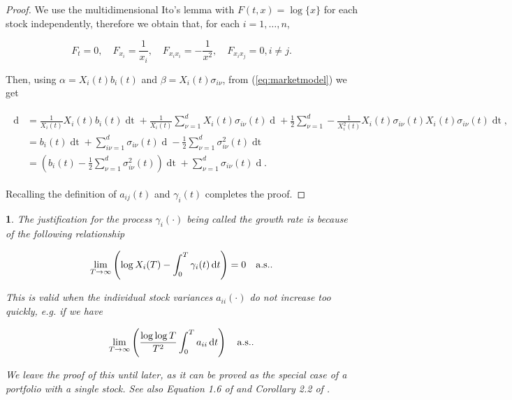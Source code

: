\documentclass[british]{amsart} \usepackage{lmodern}
\numberwithin{equation}{section} \numberwithin{figure}{section}
\theoremstyle{plain} \newtheorem{thm}{\protect\theoremname}[section]
\theoremstyle{definition} \newtheorem{defn}[thm]{\protect\definitionname}
\theoremstyle{plain} \newtheorem{assumption}[thm]{\protect\assumptionname}
\theoremstyle{plain} \newtheorem{lem}[thm]{\protect\lemmaname}
\theoremstyle{plain} \newtheorem{prop}[thm]{\protect\propositionname}
\theoremstyle{remark} \newtheorem{rem}[thm]{\protect\remarkname}
\theoremstyle{plain} \newtheorem{cor}[thm]{\protect\corollaryname}
\renewcommand{\d}[1]{\mathop{\mathrm{d}{#1}}}
\newcommand{\rangei}{i=1,\dots,n} \newcommand{\measure}{\mathbb{P}}
\begin{document}
\begin{proof}

  We use the multidimensional Ito's lemma with $F(t,x)=\log\{x\}$ for each stock
independently, therefore we obtain that, for each $\rangei$,

  \begin{equation}
    F_{t}=0, \quad F_{x_{i}}=\frac{1}{x_{i}}, \quad 
    F_{x_{i}x_{i}}=-\frac{1}{x^2}, \quad F_{x_{i}x_{j}}=0, i \neq j.
  \end{equation}

  Then, using $\alpha=X_{i}(t)b_{i}(t)$ and $\beta=X_{i}(t)\sigma_{i\nu}$, from (\ref{eq:marketmodel}) we get

  \begin{gather}
    \begin{split}
    \d{\log{X_{i}(t)}} 
        &= \frac{1}{X_{i}(t)} X_{i}(t)b_{i}(t)\d{t} 
            + \frac{1}{X_{i}(t)} \sum_{\nu=1}^d X_{i}(t)\sigma_{i\nu}(t) \d{W_{\nu}(t)} 
            + \frac{1}{2} \sum_{\nu=1}^d -\frac{1}{X_{i}^2(t)} X_{i}(t)\sigma_{i\nu}(t) X_{i}(t)\sigma_{i\nu}(t) \d{t},\\
        &= b_{i}(t)\d{t} 
            + \sum_{i\nu=1}^d \sigma_{i\nu}(t) \d{W_{\nu}(t)}
            - \frac{1}{2} \sum_{\nu=1}^d \sigma^2_{i\nu}(t) \d{t} \\
        &= \left( b_{i}(t) - \frac{1}{2} \sum_{\nu=1}^d \sigma^2_{i\nu}(t) \right) \d{t} 
            + \sum_{\nu=1}^d \sigma_{i\nu}(t) \d{W_{\nu}(t)}.
    \end{split}
  \end{gather}

  Recalling the definition of $a_{ij}(t)$ and $\gamma_{i}(t)$ completes the
  proof.

\end{proof}

\begin{lem} The justification for the process $\gamma_{i}(\cdot)$ being called the 
  \textit{growth rate} is because of the following relationship

  \begin{equation}
    \lim_{T \to \infty} 
      \left( 
      \log{X_{i}(T)} - \int_{0}^{T} \gamma_{i}(t)\d{t} 
      \right) = 0
    \quad \almostsurely.
  \end{equation}

  This is valid when the individual stock variances $a_{ii}(\cdot)$ do not
  increase too quickly, e.g. if we have 

  \begin{equation*}
    \lim_{T\to\infty} \left( \frac{\log \log T}{T^2} \int_{0}^{T} a_{ii} \d{t} \right)
    \quad \almostsurely.
  \end{equation*}

  We leave the proof of this until later, as it can be proved as the special case
  of a portfolio with a single stock. See also Equation 1.6 of \cite{fernholz2009}
  and Corollary 2.2 of \cite{fernholz1999pgf}.

\end{lem}
\end{document}
